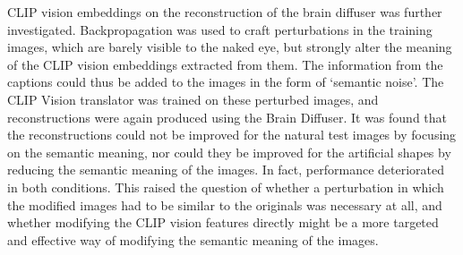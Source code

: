 CLIP vision embeddings on the reconstruction of the brain diffuser was further investigated. Backpropagation was used to craft perturbations in the training images, which are barely visible to the naked eye, but strongly alter the meaning of the CLIP vision embeddings extracted from them. The information from the captions could thus be added to the images in the form of `semantic noise'. The CLIP Vision translator was trained on these perturbed images, and reconstructions were again produced using the Brain Diffuser. It was found that the reconstructions could not be improved for the natural test images by focusing on the semantic meaning, nor could they be improved for the artificial shapes by reducing the semantic meaning of the images. In fact, performance deteriorated in both conditions. This raised the question of whether a perturbation in which the modified images had to be similar to the originals was necessary at all, and whether modifying the CLIP vision features directly might be a more targeted and effective way of modifying the semantic meaning of the images.





